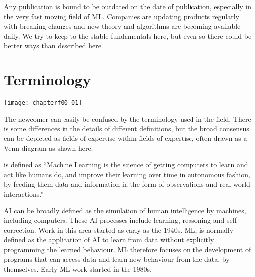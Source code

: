 Any publication is bound to be outdated on the date of publication, especially in the very fast moving field of \ac{ML}. Companies are updating products regularly with breaking changes and new theory and algorithms are becoming available daily. We try to keep to the stable fundamentals here, but even so there could be better ways than described here.

\section*{Terminology}

\begin{marginfigure}
\texttt{[image: chapterf00-01]}
\end{marginfigure}

The newcomer can easily be confused by the terminology used in the field.  There is some differences in the details of different definitions, but the broad consensus can be depicted as fields of expertise within fields of expertise, often drawn as a Venn diagram as shown here.

 is defined as\cite{DanielFaggella2019} ``Machine Learning is the science of getting computers to learn and act like humans do, and improve their learning over time in autonomous fashion, by feeding them data and information in the form of observations and real-world interactions.''

\ac{AI} can be broadly defined as the simulation of human intelligence by machines, including computers. These \ac{AI} processes include learning, reasoning and self-correction. Work in this area started as early as the 1940s. \ac{ML}\cite{WikiPediaMachineLearning2019,DanielFaggella2019}, is normally defined as the application of \ac{AI} to learn from data without explicitly programming the learned behaviour. \ac{ML} therefore focuses on the development of programs that can access data and learn new behaviour from the data, by themselves.  Early ML work started in the 1980s. 

